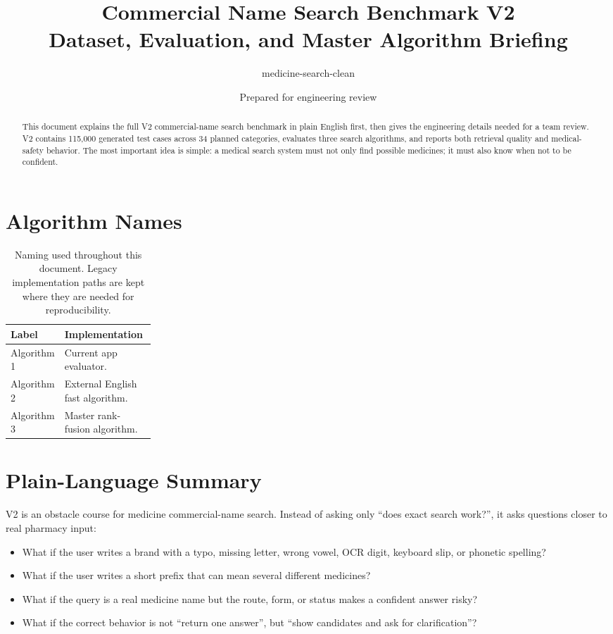 \documentclass[11pt]{article}
\title{\textbf{Commercial Name Search Benchmark V2}\\
\large Dataset, Evaluation, and Master Algorithm Briefing}
\author{medicine-search-clean}
\date{Prepared for engineering review}
\begin{document}
\maketitle

\begin{abstract}
This document explains the full V2 commercial-name search benchmark in plain
English first, then gives the engineering details needed for a team review.
V2 contains 115,000 generated test cases across 34 planned categories, evaluates
three search algorithms, and reports both retrieval quality and medical-safety
behavior. The most important idea is simple: a medical search system must not
only find possible medicines; it must also know when not to be confident.
\end{abstract}

\section{Algorithm Names}

\begin{table}[H]
\centering
\small
\begin{tabularx}{0.78\linewidth}{L{0.24\linewidth}Y}
\toprule
\textbf{Label} & \textbf{Implementation} \\
\midrule
Algorithm 1 & Current app evaluator. \\
Algorithm 2 & External English fast algorithm. \\
Algorithm 3 & Master rank-fusion algorithm. \\
\bottomrule
\end{tabularx}
\caption{Naming used throughout this document. Legacy implementation paths are
kept where they are needed for reproducibility.}
\end{table}

\section{Plain-Language Summary}

V2 is an obstacle course for medicine commercial-name search.
Instead of asking only ``does exact search work?'', it asks questions closer to
real pharmacy input:

\begin{itemize}
  \item What if the user writes a brand with a typo, missing letter, wrong vowel,
        OCR digit, keyboard slip, or phonetic spelling?
  \item What if the user writes a short prefix that can mean several different
        medicines?
  \item What if the query is a real medicine name but the route, form, or status
        makes a confident answer risky?
  \item What if the correct behavior is not ``return one answer'', but ``show
        candidates and ask for clarification''?
\end{itemize}
\end{document}
